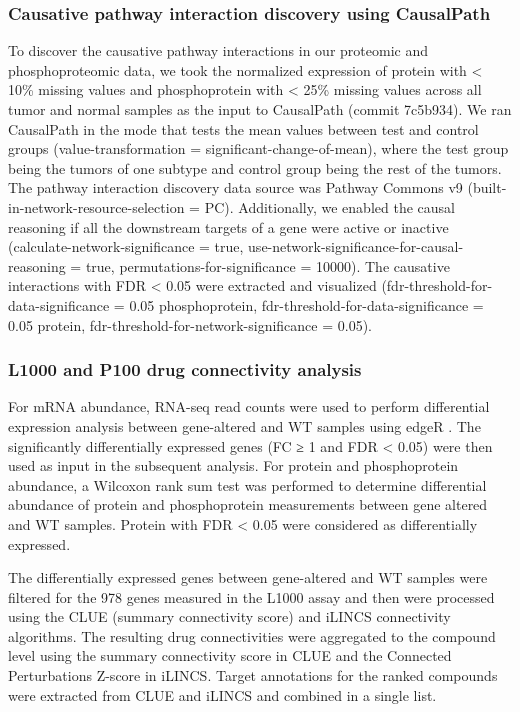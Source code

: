 \subsubsection{Causative pathway interaction discovery using CausalPath}
To discover the causative pathway interactions in our proteomic and phosphoproteomic data, we took the normalized expression of protein with < 10\% missing values and phosphoprotein with < 25\% missing values across all tumor and normal samples as the input to CausalPath (commit 7c5b934). We ran CausalPath in the mode that tests the mean values between test and control groups (value-transformation = significant-change-of-mean), where the test group being the tumors of one subtype and control group being the rest of the tumors. The pathway interaction discovery data source was Pathway Commons v9 (built-in-network-resource-selection = PC). Additionally, we enabled the causal reasoning if all the downstream targets of a gene were active or inactive (calculate-network-significance = true, use-network-significance-for-causal-reasoning = true, permutations-for-significance = 10000). The causative interactions with FDR < 0.05 were extracted and visualized (fdr-threshold-for-data-significance = 0.05 phosphoprotein, fdr-threshold-for-data-significance = 0.05 protein, fdr-threshold-for-network-significance = 0.05).

\subsubsection{L1000 and P100 drug connectivity analysis}
For mRNA abundance, RNA-seq read counts were used to perform differential expression analysis between gene-altered and WT samples using edgeR \cite{robinsonmd_smythgk:EdgeRBioconductor2010}. The significantly differentially expressed genes (FC ≥ 1 and FDR < 0.05) were then used as input in the subsequent analysis. For protein and phosphoprotein abundance, a Wilcoxon rank sum test was performed to determine differential abundance of protein and phosphoprotein measurements between gene altered and WT samples. Protein with FDR < 0.05 were considered as differentially expressed.

The differentially expressed genes between gene-altered and WT samples were filtered for the 978 genes measured in the L1000 assay and then were processed using the CLUE \cite{subramaniana_golubtr:NextGeneration2017} (summary connectivity score) and iLINCS \cite{pilarczykm_medvedovicm:ConnectingOmics2019} connectivity algorithms. The resulting drug connectivities were aggregated to the compound level using the summary connectivity score in CLUE and the Connected Perturbations Z-score in iLINCS. Target annotations for the ranked compounds were extracted from CLUE and iLINCS and combined in a single list.

